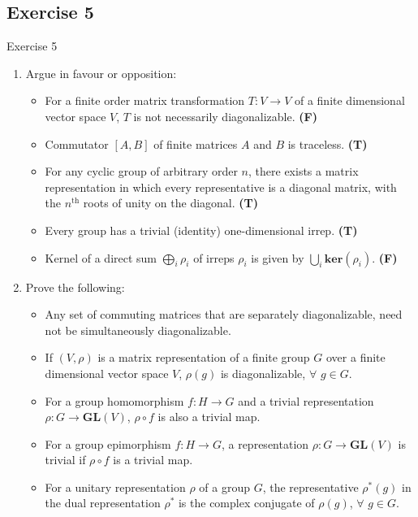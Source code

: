 \documentclass{beamer}
\begin{document}
\subsection{Exercise 5}

\begin{frame}{Exercise 5}
    \vspace{-0.1em}
    \begin{enumerate}
        \vspace{-0.15em}
        \item Argue in favour or opposition:
        \vspace{-0.1em}
        \begin{itemize}
            \item For a finite order matrix transformation $T:V\xrightarrow{}V$ of a finite dimensional vector space $V$, $T$ is not necessarily diagonalizable. \textbf{(F)}
            \item Commutator $[A,B]$ of finite matrices $A$ and $B$ is traceless. \textbf{(T)}
            \item For any cyclic group of arbitrary order $n$, there exists a matrix representation in which every representative is a diagonal matrix, with the $n^\text{th}$ roots of unity on the diagonal. \textbf{(T)}
            \item Every group has a trivial (identity) one-dimensional irrep. \textbf{(T)}
            \item Kernel of a direct sum $\bigoplus\limits_{i}\rho_i$ of irreps $\rho_i$ is given by $\bigcup\limits_{i}\mathbf{ker}(\rho_i)$. \textbf{(F)}
        \end{itemize}
        \vspace{-0.45em}
        \item Prove the following:
        \vspace{-0.1em}
        \begin{itemize}
            \item Any set of commuting matrices that are separately diagonalizable, need not be simultaneously diagonalizable.
            \item If $(V,\rho)$ is a matrix representation of a finite group $G$ over a finite dimensional vector space $V$, $\rho(g)$ is diagonalizable, $\forall$ $g\in G$.
            \item For a group homomorphism $f:H\xrightarrow{}G$ and a trivial representation $\rho:G\xrightarrow{}\mathbf{GL}(V)$, $\rho\circ f$ is also a trivial map.
            \item For a group epimorphism $f:H\xrightarrow{}G$, a representation $\rho:G\xrightarrow{}\mathbf{GL}(V)$ is trivial if $\rho\circ f$ is a trivial map.
            \item For a unitary representation $\rho$ of a group $G$, the representative $\rho^*(g)$ in the dual representation $\rho^*$ is the complex conjugate of $\rho(g)$, $\forall$ $g\in G$.
        \end{itemize}
    \end{enumerate}
\end{frame}
\end{document}
